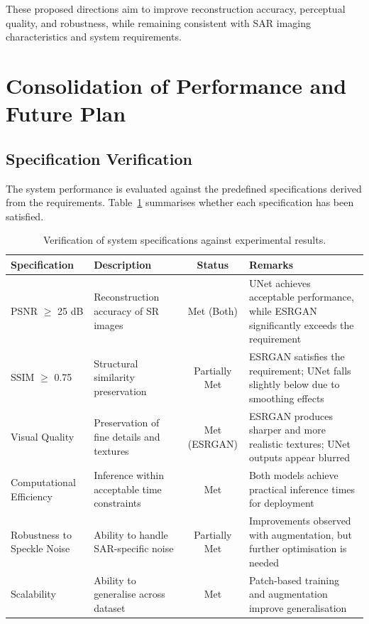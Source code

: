 \documentclass[conference]{IEEEtran}
\begin{document}
These proposed directions aim to improve reconstruction accuracy, perceptual quality, and robustness, while remaining consistent with SAR imaging characteristics and system requirements.

\section{Consolidation of Performance and Future Plan}

\subsection{Specification Verification}

The system performance is evaluated against the predefined specifications derived from the requirements. Table~\ref{tab:spec_verification} summarises whether each specification has been satisfied.

\begin{table}[h!]
\centering
\renewcommand{\arraystretch}{1.3}
\begin{tabularx}{\textwidth}{p{3cm}XcX}
\toprule
\rowcolor{gray!20}
\textbf{Specification} & \textbf{Description} & \textbf{Status} & \textbf{Remarks} \\
\midrule

PSNR $\geq$ 25 dB 
& Reconstruction accuracy of SR images 
& Met (Both) 
& UNet achieves acceptable performance, while ESRGAN significantly exceeds the requirement \\

SSIM $\geq$ 0.75 
& Structural similarity preservation 
& Partially Met 
& ESRGAN satisfies the requirement; UNet falls slightly below due to smoothing effects \\

Visual Quality 
& Preservation of fine details and textures 
& Met (ESRGAN) 
& ESRGAN produces sharper and more realistic textures; UNet outputs appear blurred \\

Computational Efficiency 
& Inference within acceptable time constraints 
& Met 
& Both models achieve practical inference times for deployment \\

Robustness to Speckle Noise 
& Ability to handle SAR-specific noise 
& Partially Met 
& Improvements observed with augmentation, but further optimisation is needed \\

Scalability 
& Ability to generalise across dataset 
& Met 
& Patch-based training and augmentation improve generalisation \\

\bottomrule
\end{tabularx}
\caption{Verification of system specifications against experimental results.}
\label{tab:spec_verification}
\end{table}
\end{document}
